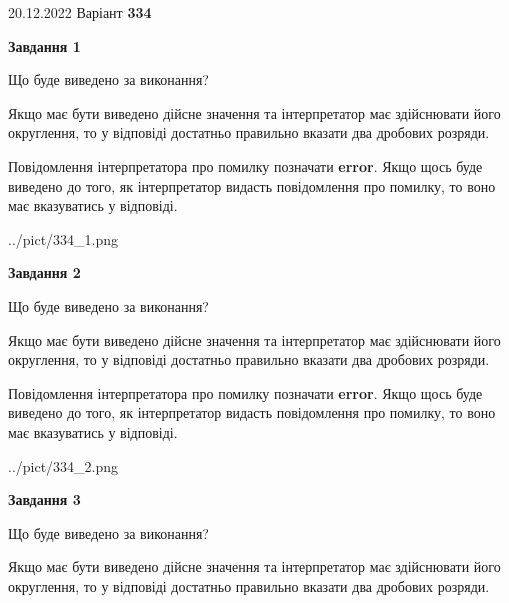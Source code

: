 \documentclass[12pt, ukrainian]{article}
\begin{document}
{20.12.2022 Варіант \No \textbf { 334 }\par}
{
\begin {Large}

{\begin {center}\textbf{Завдання 1}\end {center}}\par
Що буде виведено за виконання? \par

Якщо має бути виведено дійсне значення та інтерпретатор має здійснювати його округлення, 
то у відповіді достатньо правильно вказати два дробових розряди.

Повідомлення інтерпретатора про помилку позначати \textbf{error}.
Якщо щось буде виведено до того, як інтерпретатор видасть повідомлення про помилку, 
то воно має вказуватись у відповіді. \par

\begin{center}
	{../pict/334_1.png}
\end{center}
\newpage

{\begin {center}\textbf{Завдання 2}\end {center}}\par
Що буде виведено за виконання? \par

Якщо має бути виведено дійсне значення та інтерпретатор має здійснювати його округлення, 
то у відповіді достатньо правильно вказати два дробових розряди.

Повідомлення інтерпретатора про помилку позначати \textbf{error}.
Якщо щось буде виведено до того, як інтерпретатор видасть повідомлення про помилку, 
то воно має вказуватись у відповіді. \par

\begin{center}
	{../pict/334_2.png}
\end{center}
\newpage

{\begin {center}\textbf{Завдання 3}\end {center}}\par
Що буде виведено за виконання? \par

Якщо має бути виведено дійсне значення та інтерпретатор має здійснювати його округлення, 
то у відповіді достатньо правильно вказати два дробових розряди.


\end{Large}}
\end{document}
